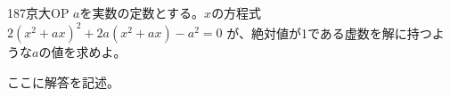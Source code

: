 \begin{prob}{187}{}{京大OP}
 $a$を実数の定数とする。$x$の方程式 $2(x^2+ax)^2+2a(x^2+ax)-a^2=0$ が、絶対値が1である虚数を解に持つような$a$の値を求めよ。
\end{prob}
ここに解答を記述。